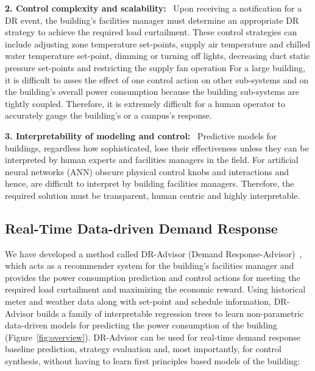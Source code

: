 \textbf{2. Control complexity and scalability:}
~Upon receiving a notification for a DR event, the building's facilities manager must determine an appropriate DR strategy to achieve the required load curtailment. 
These control strategies can include adjusting zone temperature set-points, supply air temperature and chilled water temperature set-point, dimming or turning off lights, decreasing duct static pressure set-points and restricting the supply fan operation \etc 
For a large building, it is difficult to asses the effect of one control action on other sub-systems and on the building's overall power consumption because the building sub-systems are tightly coupled. 
Therefore, it is extremely difficult for a human operator to accurately gauge the building's or a campus's response.\vspace{4pt}

\textbf{3. Interpretability of modeling and control:}
~Predictive models for buildings, regardless how sophisticated, lose their effectiveness unless they can be interpreted by human experts and facilities managers in the field.
For \eg artificial neural networks (ANN) obscure physical control knobs and interactions and hence, are difficult to interpret by building facilities managers.
Therefore, the required solution must be transparent, human centric and highly interpretable.


\subsection{Real-Time Data-driven Demand Response}

We have developed a method called DR-Advisor (Demand Response-Advisor)~\cite{dr_advisor}, which acts as a recommender system for the building's facilities manager and provides the power consumption prediction and control actions for meeting the required load curtailment and maximizing the economic reward.  
Using historical meter and weather data along with set-point and schedule information, DR-Advisor builds a family of interpretable regression trees to learn non-parametric data-driven models for predicting the power consumption of the building (Figure~\ref{fig:overview}).
DR-Advisor can be used for real-time demand response baseline prediction, strategy evaluation and, most importantly, for control synthesis, without having to learn first principles based models of the building:\vspace{4pt}

